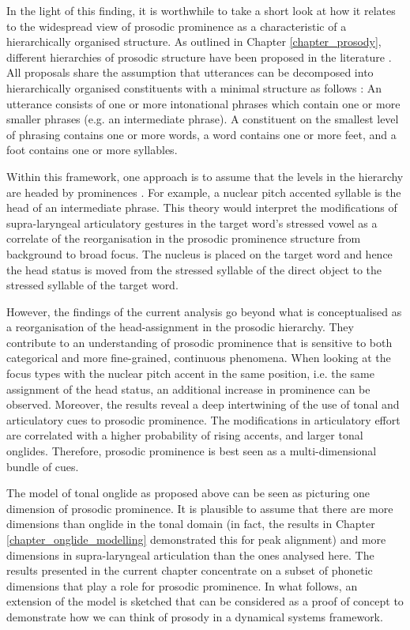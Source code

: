 In the light of this finding, it is worthwhile to take a short look at how it relates to the widespread view of prosodic prominence as a characteristic of a hierarchically organised structure. As outlined in Chapter \ref{chapter_prosody}, different hierarchies of prosodic structure have been proposed in the literature \citep{NesporVogel1986, PierrehumbertBeckman1988, Hayes1989, Selkirk1996, ShattuckHufnagelTurk1996}. All proposals share the assumption that utterances can be decomposed into hierarchically organised constituents with a minimal structure as follows \citep{Grice2006}: An utterance consists of one or more intonational phrases which contain one or more smaller phrases (e.g. an intermediate phrase). A constituent on the smallest level of phrasing contains one or more words, a word contains one or more feet, and a foot contains one or more syllables. 

Within this framework, one approach is to assume that the levels in the hierarchy are headed by prominences \citep{BeckmanEdwards1994, ShattuckHufnagelTurk1996}. For example, a nuclear pitch accented syllable is the head of an intermediate phrase. This theory would interpret the modifications of supra-laryngeal articulatory gestures in the target word’s stressed vowel as a correlate of the reorganisation in the prosodic prominence structure from background to broad focus. The nucleus is placed on the target word and hence the head status is moved from the stressed syllable of the direct object to the stressed syllable of the target word. 

However, the findings of the current analysis go beyond what is conceptualised as a reorganisation of the head-assignment in the prosodic hierarchy. They contribute to an understanding of prosodic prominence that is sensitive to both categorical and more fine-grained, continuous phenomena. When looking at the focus types with the nuclear pitch accent in the same position, i.e. the same assignment of the head status, an additional increase in prominence can be observed. Moreover, the results reveal a deep intertwining of the use of tonal and articulatory cues to prosodic prominence. The modifications in articulatory effort are correlated with a higher probability of rising accents, and larger tonal onglides. Therefore, prosodic prominence is best seen as a multi-dimensional bundle of cues. 

The model of tonal onglide as proposed above can be seen as picturing one dimension of prosodic prominence. It is plausible to assume that there are more dimensions than onglide in the tonal domain (in fact, the results in Chapter \ref{chapter_onglide_modelling} demonstrated this for peak alignment) and more dimensions in supra-laryngeal articulation than the ones analysed here. The results presented in the current chapter concentrate on a subset of phonetic dimensions that play a role for prosodic prominence. In what follows, an extension of the model is sketched that can be considered as a proof of concept to demonstrate how we can think of prosody in a dynamical systems framework.

